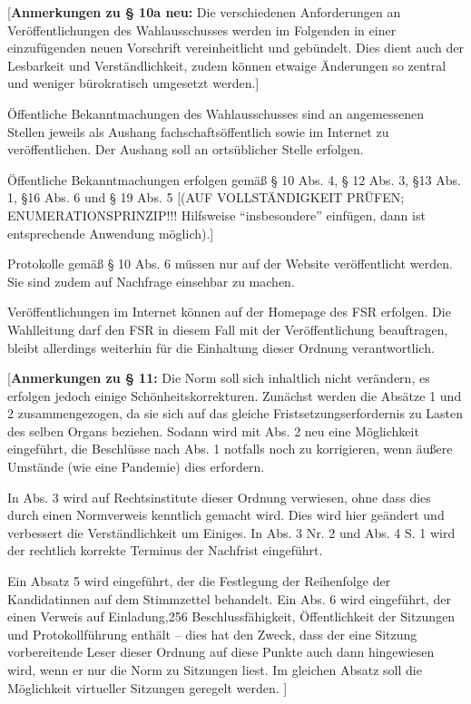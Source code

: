 \documentclass[%
draft,%
multilinesections%
]{fswo}
\newcommand\bemFr[1]{{\color{Red}[#1]}}
\newcommand\bemFr[1]{}%
\begin{document}
\bemFr{\textbf{Anmerkungen zu § 10a neu:}
Die verschiedenen Anforderungen an Veröffentlichungen des Wahlausschusses werden im Folgenden in einer einzufügenden neuen Vorschrift vereinheitlicht und gebündelt.
Dies dient auch der Lesbarkeit und Verständlichkeit, zudem können etwaige Änderungen so zentral und weniger bürokratisch umgesetzt werden.}

\begin{contract}
Öffentliche Bekanntmachungen des Wahlausschusses sind an angemessenen Stellen jeweils als Aushang fachschaftsöffentlich sowie im Internet zu veröffentlichen.
Der Aushang soll an ortsüblicher Stelle erfolgen.

Öffentliche Bekanntmachungen erfolgen gemäß § 10 Abs. 4, § 12 Abs. 3, §13 Abs. 1, §16 Abs. 6 und § 19 Abs. 5 \bemFr{(AUF VOLLSTÄNDIGKEIT PRÜFEN; ENUMERATIONSPRINZIP!!! Hilfsweise \enquote{insbesondere} einfügen, dann ist entsprechende Anwendung möglich).}

Protokolle gemäß § 10 Abs. 6 müssen nur auf der Website veröffentlicht werden.
Sie sind zudem auf Nachfrage einsehbar zu machen.

Veröffentlichungen im Internet können auf der Homepage des FSR erfolgen.
Die Wahlleitung darf den FSR in diesem Fall mit der Veröffentlichung beauftragen, bleibt allerdings weiterhin für die Einhaltung dieser Ordnung verantwortlich.
\end{contract}

\bemFr{\textbf{Anmerkungen zu § 11:}
Die Norm soll sich inhaltlich nicht verändern, es erfolgen jedoch einige Schönheitskorrekturen.
Zunächst werden die Absätze 1 und 2 zusammengezogen, da sie sich auf das gleiche Fristsetzungserfordernis zu Lasten des selben Organs beziehen.
Sodann wird mit Abs. 2 neu eine Möglichkeit eingeführt, die Beschlüsse nach Abs. 1 notfalls noch zu korrigieren,
wenn äußere Umstände (wie eine Pandemie) dies erfordern.

In Abs. 3 wird auf Rechtsinstitute dieser Ordnung verwiesen, ohne dass dies durch einen Normverweis kenntlich gemacht wird.
Dies wird hier geändert und verbessert die Verständlichkeit um Einiges.
In Abs. 3 Nr. 2 und Abs. 4 S. 1 wird der rechtlich korrekte Terminus der Nachfrist eingeführt.

Ein Absatz 5 wird eingeführt, der die Festlegung der Reihenfolge der Kandidatinnen auf dem Stimmzettel behandelt.
Ein Abs. 6 wird eingeführt, der einen Verweis auf Einladung,256 Beschlussfähigkeit, Öffentlichkeit der Sitzungen und Protokollführung enthält –
dies hat den Zweck, dass der eine Sitzung vorbereitende Leser dieser Ordnung auf diese Punkte auch dann hingewiesen wird,
wenn er nur die Norm zu Sitzungen liest. Im gleichen Absatz soll die Möglichkeit virtueller Sitzungen geregelt werden.
}
\end{document}
